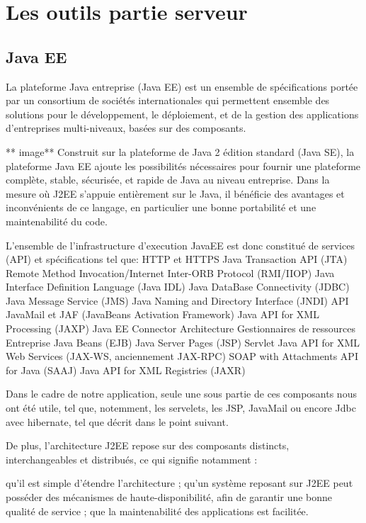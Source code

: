 \section{Les outils partie serveur}


\subsection{Java EE}

La plateforme Java entreprise (Java EE) est un ensemble de spécifications portée par un consortium de sociétés internationales qui permettent ensemble des solutions pour le développement, le déploiement, et de la gestion des applications d'entreprises multi-niveaux, basées sur des composants.

** image**
Construit sur la plateforme de Java 2 édition standard (Java SE), la plateforme Java EE ajoute les possibilités nécessaires pour fournir une plateforme complète, stable, sécurisée, et rapide de Java au niveau entreprise. 
Dans la mesure où J2EE s'appuie entièrement sur le Java, il bénéficie des avantages et inconvénients de ce langage, en particulier une bonne portabilité et une maintenabilité du code.

L'ensemble de l'infrastructure d'execution JavaEE est donc constitué de services (API) et spécifications tel que:
HTTP et HTTPS
Java Transaction API (JTA)
Remote Method Invocation/Internet Inter-ORB Protocol (RMI/IIOP)
Java Interface Definition Language (Java IDL)
Java DataBase Connectivity (JDBC)
Java Message Service (JMS)
Java Naming and Directory Interface (JNDI)
API JavaMail et JAF (JavaBeans Activation Framework)
Java API for XML Processing (JAXP)
Java EE Connector Architecture
Gestionnaires de ressources
Entreprise Java Beans (EJB)
Java Server Pages (JSP)
Servlet
Java API for XML Web Services (JAX-WS, anciennement JAX-RPC)
SOAP with Attachments API for Java (SAAJ)
Java API for XML Registries (JAXR)

Dans le cadre de notre application, seule une sous partie de ces composants nous ont été utile, tel que, notemment, les servelets, les JSP, JavaMail ou encore Jdbc avec hibernate, tel que décrit dans le point suivant.

De plus, l'architecture J2EE repose sur des composants distincts, interchangeables et distribués, ce qui signifie notamment :

qu'il est simple d'étendre l'architecture ;
qu'un système reposant sur J2EE peut posséder des mécanismes de haute-disponibilité, afin de garantir une bonne qualité de service ;
que la maintenabilité des applications est facilitée.


